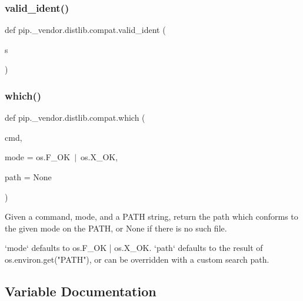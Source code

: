 \subsubsection{\texorpdfstring{valid\+\_\+ident()}{valid\_ident()}}
{\footnotesize\ttfamily def pip.\+\_\+vendor.\+distlib.\+compat.\+valid\+\_\+ident (\begin{DoxyParamCaption}\item[{}]{s }\end{DoxyParamCaption})}

\mbox{\label{namespacepip_1_1__vendor_1_1distlib_1_1compat_a800db4b1ec9d36807734094873595462}} 
\subsubsection{\texorpdfstring{which()}{which()}}
{\footnotesize\ttfamily def pip.\+\_\+vendor.\+distlib.\+compat.\+which (\begin{DoxyParamCaption}\item[{}]{cmd,  }\item[{}]{mode = {\ttfamily os.F\+\_\+OK~$\vert$~os.X\+\_\+OK},  }\item[{}]{path = {\ttfamily None} }\end{DoxyParamCaption})}

\begin{DoxyVerb}Given a command, mode, and a PATH string, return the path which
conforms to the given mode on the PATH, or None if there is no such
file.

`mode` defaults to os.F_OK | os.X_OK. `path` defaults to the result
of os.environ.get("PATH"), or can be overridden with a custom search
path.\end{DoxyVerb}
 

\subsection{Variable Documentation}
\mbox{\label{namespacepip_1_1__vendor_1_1distlib_1_1compat_a675fe09a4c6771be747845f721993abe}} 
